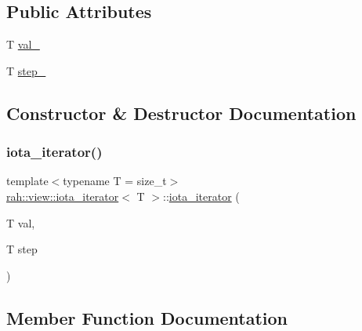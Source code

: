 \subsection*{Public Attributes}
\begin{DoxyCompactItemize}
\item 
T \mbox{\hyperlink{structrah_1_1view_1_1iota__iterator_a7a2ef77dc1a09b2eea42804c2297d057}{val\+\_\+}}
\item 
T \mbox{\hyperlink{structrah_1_1view_1_1iota__iterator_ac30abc689d8d82810bf78ceec3893bd2}{step\+\_\+}}
\end{DoxyCompactItemize}


\subsection{Constructor \& Destructor Documentation}
\mbox{\label{structrah_1_1view_1_1iota__iterator_a7807733a9a9609f8b9652e270551dc9b}} 
\subsubsection{\texorpdfstring{iota\_iterator()}{iota\_iterator()}}
{\footnotesize\ttfamily template$<$typename T  = size\+\_\+t$>$ \\
\mbox{\hyperlink{structrah_1_1view_1_1iota__iterator}{rah\+::view\+::iota\+\_\+iterator}}$<$ T $>$\+::\mbox{\hyperlink{structrah_1_1view_1_1iota__iterator}{iota\+\_\+iterator}} (\begin{DoxyParamCaption}\item[{T}]{val,  }\item[{T}]{step }\end{DoxyParamCaption})\hspace{0.3cm}{\ttfamily [inline]}}



\subsection{Member Function Documentation}
\mbox{\label{structrah_1_1view_1_1iota__iterator_afdc7732c688daecb60d17b45a678e1f1}} 
